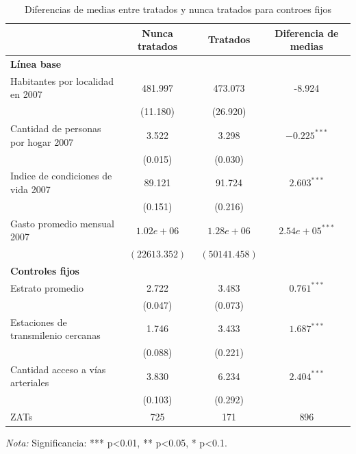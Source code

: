 \documentclass{article}
\begin{document}
\begin{table} [H]
  \centering
  \caption{Diferencias de medias entre tratados y nunca tratados para controes fijos}
  \label{tab:diferencias_medias_controles_fijos}
  \begin{adjustbox}{width=\textwidth,center}
    \begin{tabular}{l c c c}
      \toprule
      \multicolumn{1}{c}{} & \multicolumn{1}{c}{\textbf{Nunca tratados}} & \multicolumn{1}{c}{\textbf{Tratados}} & \multicolumn{1}{c}{\textbf{Diferencia de medias}} \\
      \midrule
       \midrule
      \multicolumn{4}{l}{\textbf{Línea base}} \\
      \midrule
      Habitantes por localidad en 2007 & 481.997 & 473.073 & -8.924 \\
      & (11.180) & (26.920) & \\
      Cantidad de personas por hogar 2007 & 3.522 & 3.298 & $-0.225^{***}$ \\
      & (0.015) & (0.030) & \\
      Indice de condiciones de vida 2007 & 89.121 & 91.724 & $2.603^{***}$ \\
      & (0.151) & (0.216) & \\
      Gasto promedio mensual 2007 & $1.02e+06$ & $1.28e+06$ & $2.54e+05^{***}$ \\
      & $(22613.352)$ & $(50141.458)$ & \\
      \midrule
      \multicolumn{4}{l}{\textbf{Controles fijos}} \\
      \midrule
      Estrato promedio & 2.722 & 3.483 & $0.761^{***}$ \\
      & (0.047) & (0.073) & \\
      Estaciones de transmilenio cercanas & 1.746 & 3.433 & $1.687^{***}$ \\
      & (0.088) & (0.221) & \\
      Cantidad acceso a vías arteriales & 3.830 & 6.234 & $2.404^{***}$ \\
      & (0.103) & (0.292) & \\
      \midrule
      \midrule
      ZATs & 725 & 171 & 896 \\
      \bottomrule
    \end{tabular}
  \end{adjustbox}
   \parbox[t]{\textwidth}{%
    \vspace{0.5em}
    \footnotesize{ \textit{Nota:} Significancia: *** p<0.01, ** p<0.05, * p<0.1.}}
\end{table}
\end{document}
